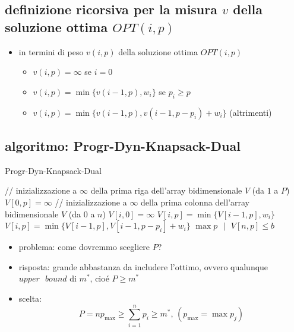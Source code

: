 
\subsection*{definizione ricorsiva per la misura $v$ della soluzione ottima $OPT(i,p)$}
\begin{flushleft}
	\begin{itemize}
		\item in termini di peso $v(i,p)$ della soluzione ottima $OPT(i,p)$
		\begin{itemize}
			\item $v(i,p)=\infty$ se $i=0$
			\item $v(i,p)=\min\{v(i-1,p),w_i\}$ se $p_i\geq p$
			\item $v(i,p)=\min\{v(i-1,p),v(i-1,p-p_i)+w_i\}$ (altrimenti)
		\end{itemize}
	\end{itemize}
\end{flushleft}


\newpage
\subsection*{algoritmo: Progr-Dyn-Knapsack-Dual}
\begin{flushleft}
	\begin{algorithm}
		\caption{Progr-Dyn-Knapsack-Dual}
		\begin{algorithmic}
			\STATE \color{gray} // inizializzazione a $\infty$ della prima riga dell'array bidimensionale $V$ (da $1$ a $P$) \color{black}
				\STATE $V[0,p]=\infty$
			\ENDFOR
			\STATE \color{gray} // inizializzazione a $\infty$ della prima colonna dell'array bidimensionale $V$ (da $0$ a $n$) \color{black}
				\STATE $V[i,0]=\infty$
			\ENDFOR
						\STATE $V[i,p]=\min\{V[i-1,p],w_i\}$
					\ELSE
						\STATE $V[i,p]=\min\{V[i-1,p],V[i-1,p-p_i]+w_i\}$
					\ENDIF
				\ENDFOR
			\ENDFOR
			\RETURN $\max p\text{ }\vert\text{ }V[n,p]\leq b$
		\end{algorithmic}
	\end{algorithm}
	\begin{itemize}
		\item problema: come dovremmo scegliere $P$?
		\item risposta: grande abbastanza da includere l'ottimo, ovvero qualunque $upper\text{ }bound$ di $m^*$, cio\'e $P\geq m^*$
		\item scelta:
			$$P=np_{\max}\geq\sum_{i=1}^np_i\geq m^*\text{, }(p_{\max}=\max p_j)$$
	\end{itemize}
\end{flushleft}

